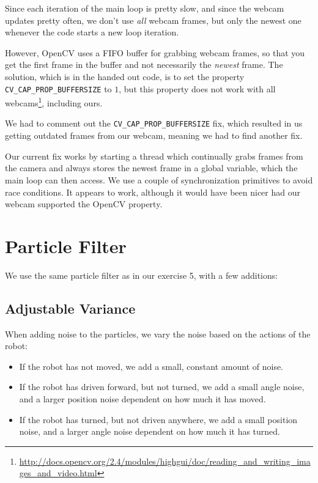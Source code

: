\documentclass[a4paper,12pt]{article}
\begin{document}
Since each iteration of the main loop is pretty slow, and since the webcam
updates pretty often, we don't use \emph{all} webcam frames, but only the newest
one whenever the code starts a new loop iteration.

However, OpenCV uses a FIFO buffer for grabbing webcam frames, so that you get
the first frame in the buffer and not necessarily the \emph{newest} frame.  The
solution, which is in the handed out code, is to set the property
\texttt{CV_CAP_PROP_BUFFERSIZE} to $1$, but this property does not work with all
webcams\footnote{\url{http://docs.opencv.org/2.4/modules/highgui/doc/reading_and_writing_images_and_video.html}},
including ours.

We had to comment out the \texttt{CV_CAP_PROP_BUFFERSIZE} fix, which resulted in
us getting outdated frames from our webcam, meaning we had to find another fix.

Our current fix works by starting a thread which continually grabs frames from
the camera and always stores the newest frame in a global variable, which the
main loop can then access.  We use a couple of synchronization primitives to
avoid race conditions.  It appears to work, although it would have been nicer
had our webcam supported the OpenCV property.


\newpage
\section{Particle Filter}

We use the same particle filter as in our exercise 5, with a few additions:

\subsection{Adjustable Variance}

When adding noise to the particles, we vary the noise based on the actions of
the robot:

\begin{itemize}
\item If the robot has not moved, we add a small, constant amount of noise.
\item If the robot has driven forward, but not turned, we add a small angle
noise, and a larger position noise dependent on how much it has moved.
\item If the robot has turned, but not driven anywhere, we add a small position
noise, and a larger angle noise dependent on how much it has turned.
\end{itemize}
\end{document}
